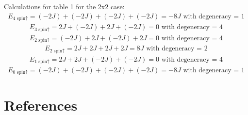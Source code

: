 \documentclass[12pt,english,a4paper]{article}
\begin{document}
Calculations for table 1 for the 2x2 case:
\begin{align*}
    E_{\text{4 spin}\uparrow} = (-2J) + (-2J) + (-2J) + (-2J) = -8J \text{ with degeneracy = 1}
\end{align*}
\begin{align*}
    E_{\text{3 spin}\uparrow} = 2J + (-2J) + 2J + (-2J) = 0 \text{ with degeneracy = 4}
\end{align*}
\begin{align*}
    E_{\text{2 spin}\uparrow} = (-2J) + 2J + (-2J) + 2J = 0 \text{ with degeneracy = 4}
\end{align*}
\begin{align*}
    E_{\text{2 spin}\uparrow} = 2J + 2J + 2J + 2J = 8J \text{ with degeneracy = 2}
\end{align*}
\begin{align*}
    E_{\text{1 spin}\uparrow} = 2J + 2J + (-2J) + (-2J) = 0 \text{ with degeneracy = 4}
\end{align*}
\begin{align*}
    E_{\text{0 spin}\uparrow} = (-2J) + (-2J) + (-2J) + (-2J) = -8J \text{ with degeneracy = 1}
\end{align*}


\section{References}
\end{document}
